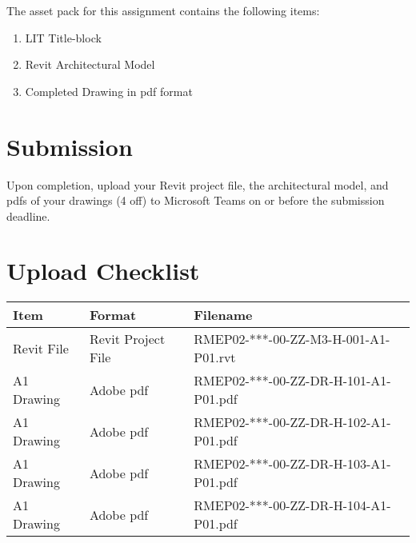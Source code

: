 The asset pack for this assignment contains the following items:
\begin{enumerate}
	\item LIT Title-block
	\item Revit Architectural Model
	\item Completed Drawing in pdf format
\end{enumerate}


\section*{Submission}
Upon completion, upload your Revit project file, the architectural model, and pdfs of your drawings (4 off) to Microsoft Teams on or before the submission deadline.

\section*{Upload Checklist}

\begin{tabular}{|l|l|l|}
	\hline
	\textbf{Item} & \textbf{Format} & \textbf{Filename} \\
	\hline
	Revit File  & Revit Project File & RMEP02-***-00-ZZ-M3-H-001-A1-P01.rvt  \\
	A1 Drawing  & Adobe pdf & RMEP02-***-00-ZZ-DR-H-101-A1-P01.pdf  \\
	A1 Drawing  & Adobe pdf & RMEP02-***-00-ZZ-DR-H-102-A1-P01.pdf  \\
	A1 Drawing  & Adobe pdf & RMEP02-***-00-ZZ-DR-H-103-A1-P01.pdf  \\
	A1 Drawing  & Adobe pdf & RMEP02-***-00-ZZ-DR-H-104-A1-P01.pdf  \\
	\hline
\end{tabular}



